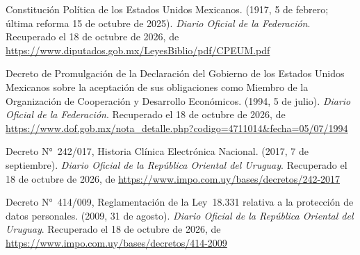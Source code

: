 \documentclass[12pt, a4paper]{article}
\begin{document}
\begin{list}{}{\setlength{\leftmargin}{1.27cm}\setlength{\itemindent}{-1.27cm}%
  \setlength{\labelwidth}{0pt}\setlength{\labelsep}{0pt}\setlength{\itemsep}{6pt}}
\item Constitución Política de los Estados Unidos Mexicanos.
  (1917, 5 de febrero; última reforma 15 de octubre de 2025). \textit{Diario Oficial
  de la Federación}. Recuperado el 18 de octubre de 2026, de \url{https://www.diputados.gob.mx/LeyesBiblio/pdf/CPEUM.pdf}
 
 
\item Decreto de Promulgación de la Declaración del Gobierno de los
  Estados Unidos Mexicanos sobre la aceptación de sus obligaciones como
  Miembro de la Organización de Cooperación y Desarrollo Económicos.
  (1994, 5 de julio). \textit{Diario Oficial de la Federación}.
  Recuperado el 18 de octubre de 2026, de \url{https://www.dof.gob.mx/nota_detalle.php?codigo=4711014&fecha=05/07/1994}
 
  
\item Decreto N°~242/017, Historia Clínica Electrónica Nacional.
  (2017, 7 de septiembre). \textit{Diario Oficial de la República
  Oriental del Uruguay}.
  Recuperado el 18 de octubre de 2026, de \url{https://www.impo.com.uy/bases/decretos/242-2017}


\item Decreto N°~414/009, Reglamentación de la Ley~18.331 relativa
  a la protección de datos personales. (2009, 31 de agosto).
  \textit{Diario Oficial de la República Oriental del Uruguay}.
  Recuperado el 18 de octubre de 2026, de \url{https://www.impo.com.uy/bases/decretos/414-2009}



\end{list}
\end{document}
